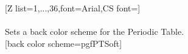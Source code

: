 \newpage
{}[Z list={1,...,36},font=Arial,CS font=\string{}\string\selectfont]%
\\ [10pt]%
\\ [5pt]\pgfPTendoption%
\label{option_back color scheme}%
\vfill
{}%
{Sets a  back color scheme for the Periodic Table.}%
\\ [5pt][back color scheme=pgfPTSoft]%
\\ [5pt]\makebox[\linewidth][c]{\scalebox{.6}{\pgfPT[back color scheme=pgfPTSoft]}}%
\newpage%
